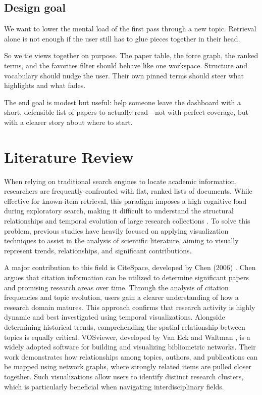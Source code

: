 \documentclass[sigconf]{acmart}
\begin{document}
\subsection{Design goal}
We want to lower the mental load of the first pass through a new topic. Retrieval alone is not enough if the user still has to glue pieces together in their head.

So we tie views together on purpose. The paper table, the force graph, the ranked terms, and the favorites filter should behave like one workspace. Structure and vocabulary should nudge the user. Their own pinned terms should steer what highlights and what fades.

The end goal is modest but useful: help someone leave the dashboard with a short, defensible list of papers to actually read---not with perfect coverage, but with a clearer story about where to start.

\section{Literature Review}

When relying on traditional search engines to locate academic information, researchers are frequently confronted with flat, ranked lists of documents. While effective for known-item retrieval, this paradigm imposes a high cognitive load during exploratory search, making it difficult to understand the structural relationships and temporal evolution of large research collections \cite{hearst2009search, marchionini2006exploratory}. To solve this problem, previous studies have heavily focused on applying visualization techniques to assist in the analysis of scientific literature, aiming to visually represent trends, relationships, and significant contributions. 

A major contribution to this field is CiteSpace, developed by Chen (2006) \cite{chen2006citespace}. Chen argues that citation information can be utilized to determine significant papers and promising research areas over time. Through the analysis of citation frequencies and topic evolution, users gain a clearer understanding of how a research domain matures. This approach confirms that research activity is highly dynamic and best investigated using temporal visualizations. Alongside determining historical trends, comprehending the spatial relationship between topics is equally critical. VOSviewer, developed by Van Eck and Waltman \cite{vaneck2010vosviewer}, is a widely adopted software for building and visualizing bibliometric networks. Their work demonstrates how relationships among topics, authors, and publications can be mapped using network graphs, where strongly related items are pulled closer together. Such visualizations allow users to identify distinct research clusters, which is particularly beneficial when navigating interdisciplinary fields.
\end{document}
